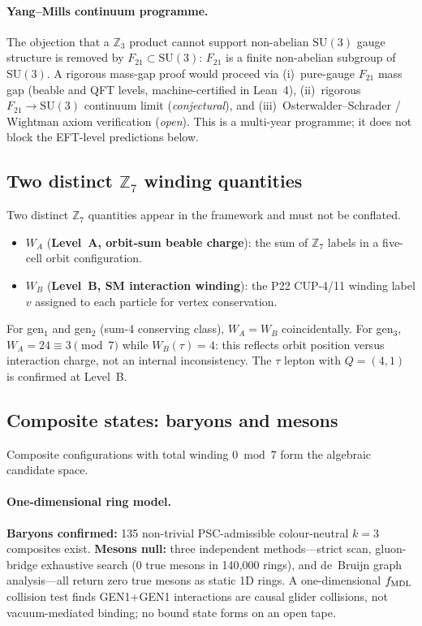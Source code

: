 \paragraph{Yang--Mills continuum programme.}
The objection that a $\mathbb{Z}_3$ product cannot support non-abelian $\mathrm{SU}(3)$ gauge structure is removed by $F_{21} \subset \mathrm{SU}(3)$: $F_{21}$ is a finite non-abelian subgroup of $\mathrm{SU}(3)$.
A rigorous mass-gap proof would proceed via (i)~pure-gauge $F_{21}$ mass gap (beable and QFT levels, machine-certified in Lean~4), (ii)~rigorous $F_{21} \to \mathrm{SU}(3)$ continuum limit (\emph{conjectural}), and (iii)~Osterwalder--Schrader / Wightman axiom verification (\emph{open}).
This is a multi-year programme; it does not block the EFT-level predictions below.

\subsection{Two distinct \texorpdfstring{$\mathbb{Z}_7$}{Z7} winding quantities}
\label{sec:wa_wb}

Two distinct $\mathbb{Z}_7$ quantities appear in the framework and must not be conflated.

\begin{itemize}
\item $W_A$ (\textbf{Level~A, orbit-sum beable charge}): the sum of $\mathbb{Z}_7$ labels in a five-cell orbit configuration.
\item $W_B$ (\textbf{Level~B, SM interaction winding}): the P22 CUP-4/11 winding label $v$ assigned to each particle for vertex conservation.
\end{itemize}

For gen$_1$ and gen$_2$ (sum-4 conserving class), $W_A = W_B$ coincidentally.
For gen$_3$, $W_A = 24 \equiv 3 \pmod{7}$ while $W_B(\tau) = 4$: this reflects orbit position versus interaction charge, not an internal inconsistency.
The $\tau$ lepton with $Q = (4,1)$ is confirmed at Level~B.

\subsection{Composite states: baryons and mesons}
\label{sec:composite_states}

Composite configurations with total winding $0 \bmod 7$ form the algebraic candidate space.

\paragraph{One-dimensional ring model.}
\textbf{Baryons confirmed:} 135 non-trivial PSC-admissible colour-neutral $k=3$ composites exist.
\textbf{Mesons null:} three independent methods---strict scan, gluon-bridge exhaustive search (0 true mesons in 140{,}000 rings), and de~Bruijn graph analysis---all return zero true mesons as static 1D rings.
A one-dimensional $f_{\rm MDL}$ collision test finds GEN1+GEN1 interactions are causal glider collisions, not vacuum-mediated binding; no bound state forms on an open tape.

